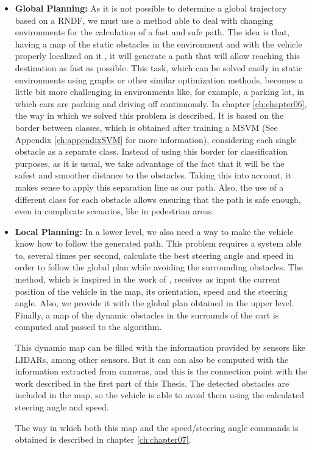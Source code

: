 \begin{itemize}
 \item \textbf{Global Planning:}
 As it is not possible to determine a global trajectory based on a \ac{RNDF}, we must use a method able to deal with changing environments for the calculation of a fast and safe path. The idea is that, having a map of the static obstacles in the environment and with the vehicle properly localized on it \cite{Perea2013mcl}, it will generate a path that will allow reaching this destination as fast as possible. This task, which can be solved easily in static environments using graphs or other similar optimization methods, becomes a little bit more challenging in environments like, for example, a parking lot, in which cars are parking and driving off continuously.
 In chapter \ref{ch:chapter06}, the way in which we solved this problem is described. It is based on the border between classes, which is obtained after training a \ac{MSVM} (See Appendix \ref{ch:appendixSVM} for more information), considering each single obstacle as a separate class. Instead of using this border for classification purposes, as it is usual, we take advantage of the fact that it will be the safest and smoother distance to the obstacles. Taking this into account, it makes sense to apply this separation line as our path. Also, the use of a different class for each obstacle allows ensuring that the path is safe enough, even in complicate scenarios, like in pedestrian areas.
 
 \item \textbf{Local Planning:}
 In a lower level, we also need a way to make the vehicle know how to follow the generated path. This problem requires a system able to, several times per second, calculate the best steering angle and speed in order to follow the global plan while avoiding the surrounding obstacles. The method, which is inspired in the work of \cite{chu2012local}, receives as input the current position of the vehicle in the map, its orientation, speed and the steering angle. Also, we provide it with the global plan obtained in the upper level. Finally, a map of the dynamic obstacles in the surrounds of the cart is computed and passed to the algorithm.
 
 This dynamic map can be filled with the information provided by sensors like \acp{LIDAR}, among other sensors. But it can can also be computed with the information extracted from cameras, and this is the connection point with the work described in the first part of this Thesis. The detected obstacles are included in the map, so the vehicle is able to avoid them using the calculated steering angle and speed.
 
 The way in which both this map and the speed/steering angle commands is obtained is described in chapter \ref{ch:chapter07}.
\end{itemize}
 
